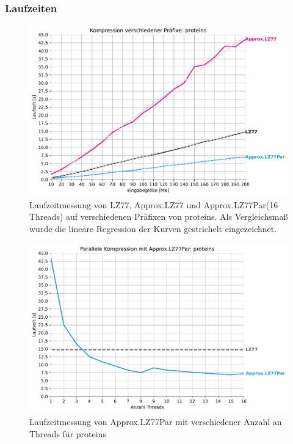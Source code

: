 \subsubsection{Laufzeiten}
\begin{figure}[ht]
    \centering
    \caption{Laufzeitmessung von LZ77, Approx.LZ77 und Approx.LZ77Par(16 Threads) auf verschiedenen Präfixen von proteins. Als Vergleichsmaß wurde 
    die lineare Regression der Kurven gestrichelt eingezeichnet.}
    \includegraphics[scale=0.6]{Images/progressive_proteins.pdf}
\end{figure}
    
\begin{figure}[ht]
    \centering
    \caption{Laufzeitmessung von Approx.LZ77Par mit verschiedener Anzahl an Threads für proteins}
    \includegraphics[scale=0.6]{Images/progressive_speedup_proteins.pdf}
\end{figure}

